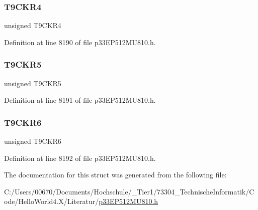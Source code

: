 \subsubsection{\texorpdfstring{T9\+C\+K\+R4}{T9CKR4}}
{\footnotesize\ttfamily unsigned T9\+C\+K\+R4}



Definition at line 8190 of file p33\+E\+P512\+M\+U810.\+h.

\mbox{\label{structtag_r_p_i_n_r6_b_i_t_s_a400b840b114275cfb7604bf00679a318}} 
\subsubsection{\texorpdfstring{T9\+C\+K\+R5}{T9CKR5}}
{\footnotesize\ttfamily unsigned T9\+C\+K\+R5}



Definition at line 8191 of file p33\+E\+P512\+M\+U810.\+h.

\mbox{\label{structtag_r_p_i_n_r6_b_i_t_s_ac2eb7628b486b6927ac46fde3b617f79}} 
\subsubsection{\texorpdfstring{T9\+C\+K\+R6}{T9CKR6}}
{\footnotesize\ttfamily unsigned T9\+C\+K\+R6}



Definition at line 8192 of file p33\+E\+P512\+M\+U810.\+h.



The documentation for this struct was generated from the following file\+:\begin{DoxyCompactItemize}
\item 
C\+:/\+Users/00670/\+Documents/\+Hochschule/\+\_\+\+Tier1/73304\+\_\+\+Technische\+Informatik/\+Code/\+Hello\+World4.\+X/\+Literatur/\hyperlink{p33_e_p512_m_u810_8h}{p33\+E\+P512\+M\+U810.\+h}\end{DoxyCompactItemize}
